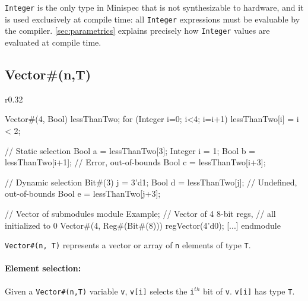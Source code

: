 \verb|Integer| is the only type in Minispec that is not synthesizable to hardware, and it is used exclusively at compile time:
all \verb|Integer| expressions must be evaluable by the compiler.
\autoref{sec:parametrics} explains precisely how \verb|Integer| values are evaluated at compile time.

\subsection{Vector\#(n,T)}
\label{sec:vector}

\begin{wrapfigure}{r}{0.32\columnwidth}
\vspace{-4em}
\begin{mscode}
Vector#(4, Bool) lessThanTwo;
for (Integer i=0; i<4; i=i+1)
  lessThanTwo[i] = i < 2;

// Static selection
Bool a = lessThanTwo[3];
Integer i = 1;
Bool b = lessThanTwo[i+1];
// Error, out-of-bounds
Bool c = lessThanTwo[i+3];

// Dynamic selection
Bit#(3) j = 3'd1;
Bool d = lessThanTwo[j];
// Undefined, out-of-bounds
Bool e = lessThanTwo[j+3];

// Vector of submodules
module Example;
  // Vector of 4 8-bit regs,
  // all initialized to 0
  Vector#(4, Reg#(Bit#(8)))
    regVector(4'd0);
  [...]
endmodule
\end{mscode}
\vspace{-6em}
\end{wrapfigure}

\verb|Vector#(n, T)| represents a vector or array of \verb|n| elements of type \verb|T|.

\paragraph{Element selection:} 
Given a \verb|Vector#(n,T)| variable \verb|v|,
\verb|v[i]| selects the \verb|i|$^{th}$ bit of \verb|v|.
\verb|v[i]| has type \verb|T|.

